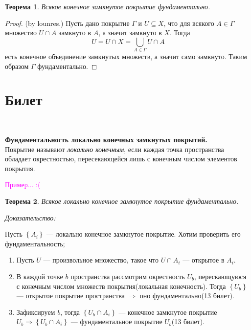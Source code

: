 \documentclass[a4paper,100pt]{article}
\theoremstyle{indented}
\newtheorem{theorem}{Теорема}
\begin{document}
\begin{theorem}
    Всякое конечное замкнутое покрытие фундаментально.
\end{theorem}

\begin{proof}
    \textrm(by lounres.) Пусть дано покрытие $\Gamma$ и $U \subseteq X$, что для всякого $A \in \Gamma$ множество $U \cap A$ замкнуто в $A$, а значит замкнуто в $X$. Тогда
        \[
            U = U \cap X = \bigcup_{A \in \Gamma} U \cap A
        \]
    есть конечное объединение замкнутых множеств, а значит само замкнуто. Таким образом $\Gamma$ фундаментально.
\end{proof}


\section{Билет} \

\textbf{Фундаментальность локально конечных замкнутых покрытий.}\\
    
    Покрытие называют \textit{\textcolor{black}{локально конечным}}, если каждая точка пространства обладает окрестностью, пересекающейся лишь с конечным числом элементов покрытия. 
    
    \textcolor{magenta}{Пример... :(}
    
    \begin{theorem}
        Всякое локально конечное замкнутое покрытие фундаментально.
    \end{theorem}
    \textit{Доказательство:}
    
    Пусть $\left\{A_i\right\}$ --- локально конечное замкнутое покрытие. Хотим проверить его фундаментальность;
        \begin{enumerate}
            \item Пусть $U$ --- произвольное множество, такое что $U \cap A_i$ --- открытое в $A_i$.
            \item В каждой точке $b$ пространства рассмотрим окрестность $U_b$, перескающуюся с конечным числом множеств покрытия(локальная конечность). Тогда $\left\{U_b\right\}$ --- открытое покрытие пространства $\Rightarrow$ оно фундаментально(13 билет). 
            \item Зафиксируем $b$, тогда $\left\{U_b \cap A_i\right\}$ --- конечное замкнутое покрытие $U_b \Rightarrow \left\{U_b \cap A_i\right\}$ --- фундаментальное покрытие $U_b$(13 билет).
        \end{enumerate}
        
\end{document}
